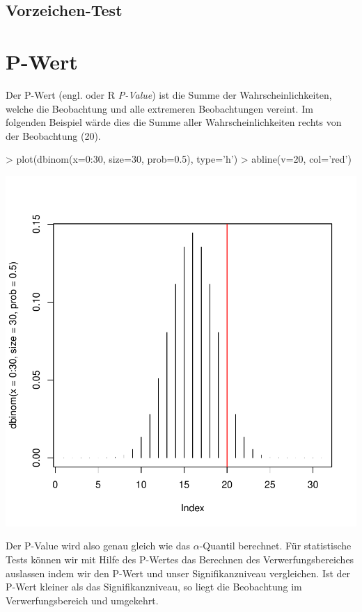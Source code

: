 \subsection{Vorzeichen-Test}


\section{P-Wert}
Der P-Wert (engl. oder R \emph{P-Value}) ist die Summe der 
Wahrscheinlichkeiten, welche die Beobachtung
und alle extremeren Beobachtungen vereint. Im folgenden Beispiel wärde dies
die Summe aller Wahrscheinlichkeiten rechts von der Beobachtung (20).

\begin{Schunk}
\begin{Sinput}
> plot(dbinom(x=0:30, size=30, prob=0.5), type='h')
> abline(v=20, col='red')
\end{Sinput}
\end{Schunk}
\includegraphics{definitionen-027}

\noindent
Der P-Value wird also genau gleich wie das $\alpha$-Quantil berechnet.
Für statistische Tests können wir mit Hilfe des P-Wertes das Berechnen
des Verwerfungsbereiches auslassen indem wir den P-Wert und unser
Signifikanzniveau vergleichen. Ist der P-Wert kleiner als das 
Signifikanzniveau, so liegt die Beobachtung im Verwerfungsbereich
und umgekehrt.

